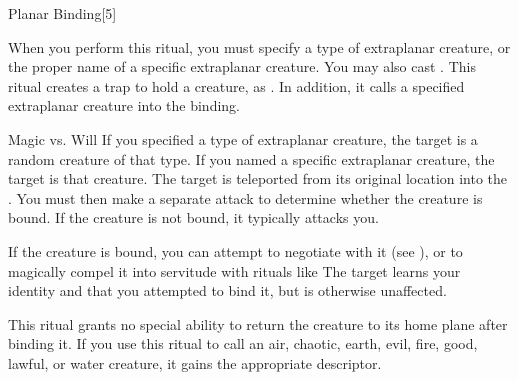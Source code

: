\begin{spellsection}[Lesser]{Planar Binding}[5]
    \begin{spellheader}
    \end{spellheader}
    \begin{spellcontent}
        \begin{spelltargetinginfo}
        \end{spelltargetinginfo}
        \begin{spelleffects}

            \spellspecial When you perform this ritual, you must specify a type of extraplanar creature, or the proper name of a specific extraplanar creature. You may also cast .
            \spellline
            \spelleffect This ritual creates a trap to hold a creature, as . In addition, it calls a specified extraplanar creature into the binding.
            \begin{spellattack}{Magic vs. Will}
                \spellspecial If you specified a type of extraplanar creature, the target is a random creature of that type. If you named a specific extraplanar creature, the target is that creature.
                \spellsuccess The target is teleported from its original location into the . You must then make a separate attack to determine whether the creature is bound. If the creature is not bound, it typically attacks you.

                If the creature is bound, you can attempt to negotiate with it (see ), or to magically compel it into servitude with rituals like 
                \spellfailure The target learns your identity and that you attempted to bind it, but is otherwise unaffected.
            \end{spellattack}
        \end{spelleffects}
    \end{spellcontent}
    \begin{spellfooter}
        \spellnotes This ritual grants no special ability to return the creature to its home plane after binding it. If you use this ritual to call an air, chaotic, earth, evil, fire, good, lawful, or water creature, it gains the appropriate descriptor.
    \end{spellfooter}
\end{spellsection}

